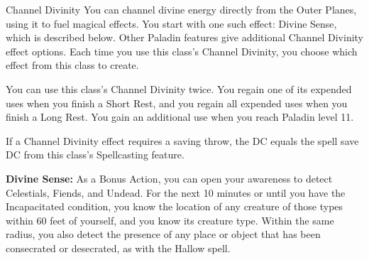 \begin{DndComment}[]{Channel Divinity}
	You can channel divine energy directly from the Outer Planes, using it to fuel magical effects. You start with one such effect: Divine Sense, which is described below. Other Paladin features give additional Channel Divinity effect options. Each time you use this class’s Channel Divinity, you choose which effect from this class to create.
	
	You can use this class’s Channel Divinity twice. You regain one of its expended uses when you finish a Short Rest, and you regain all expended uses when you finish a Long Rest. You gain an additional use when you reach Paladin level 11.
	
	If a Channel Divinity effect requires a saving throw, the DC equals the spell save DC from this class’s Spellcasting feature.
	
	\textbf{Divine Sense:} As a Bonus Action, you can open your awareness to detect Celestials, Fiends, and Undead. For the next 10 minutes or until you have the Incapacitated condition, you know the location of any creature of those types within 60 feet of yourself, and you know its creature type. Within the same radius, you also detect the presence of any place or object that has been consecrated or desecrated, as with the Hallow spell.
	
	
\end{DndComment}



\endgroup

